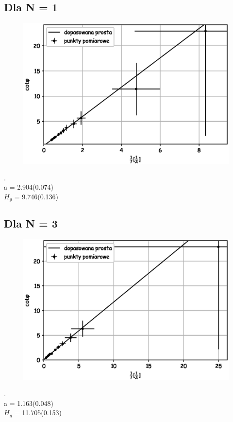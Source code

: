 \documentclass[a4paper,10pt]{article}
\begin{document}
\subsection{Dla N = 1}

\begin{figure}[H]
  \includegraphics{./wykres_1.eps}
  \caption{}
  \label{}
\end{figure}.
\\a = 2.904(0.074)\\
$H_g$ = 9.746(0.136)\\
\subsection{Dla N = 3}

\begin{figure}[H]
  \includegraphics{./wykres_3.eps}
  \caption{}
  \label{}
\end{figure}.
\\a = 1.163(0.048)\\
$H_g$ = 11.705(0.153)\\
\end{document}
